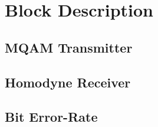 \documentclass[a4paper]{article}
\begin{document}
\pagebreak


\section{Block Description}

\subsection{MQAM Transmitter}

\subsection{Homodyne Receiver}


\subsection{Bit Error-Rate}

\end{document}
